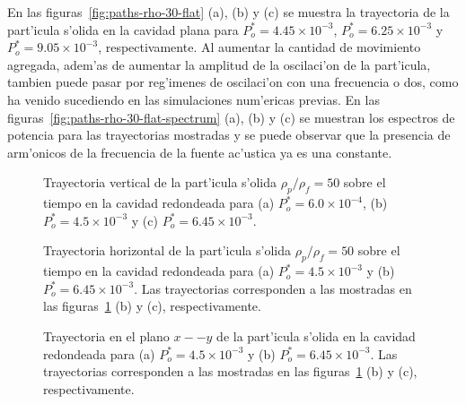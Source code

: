 En las figuras~\ref{fig:paths-rho-30-flat} (a), (b) y (c) se muestra la trayectoria de la part'icula
s'olida en la cavidad plana para $P_o^\ast = 4.45\times 10^{-3} $, $P_o^\ast = 6.25\times 10^{-3}$ y $P_o^\ast = 9.05\times 10^{-3}$,
respectivamente. Al aumentar la cantidad de movimiento agregada, adem'as de aumentar la amplitud de la oscilaci'on
de la part'icula, tambien puede pasar por reg'imenes de oscilaci'on con una frecuencia o dos, como ha venido sucediendo
en las simulaciones num'ericas previas. 
En las figuras~\ref{fig:paths-rho-30-flat-spectrum} (a), (b) y (c) se muestran los espectros
de potencia para las trayectorias mostradas y se puede observar que  la presencia de arm'onicos de la frecuencia
de la fuente ac'ustica  ya es una constante.



\begin{figure}

%


\caption{\label{fig:paths-rho-30-rounded}
Trayectoria vertical de la part'icula s'olida $\rho_p/\rho_f=50$ sobre el tiempo en la cavidad redondeada para
(a) $P_o^\ast = 6.0\times 10^{-4} $,
(b) $P_o^\ast = 4.5\times 10^{-3}$
y
(c) $P_o^\ast = 6.45\times 10^{-3}$.
}
\end{figure}
%
\begin{figure}


\caption{\label{fig:paths-rho-30-rounded-x}
Trayectoria horizontal de la part'icula s'olida $\rho_p/\rho_f=50$ sobre el tiempo en la cavidad redondeada para
(a) $P_o^\ast = 4.5\times 10^{-3}$
y
(b) $P_o^\ast = 6.45\times 10^{-3}$. Las trayectorias corresponden a las mostradas en las 
figuras~\ref{fig:paths-rho-30-rounded} (b) y (c), respectivamente.
}
\end{figure}
\begin{figure}


\caption{\label{fig:paths-rho-30-rounded-x-y} 
Trayectoria en el plano $x--y$ de la part'icula s'olida en la cavidad redondeada  para
(a) $P_o^\ast = 4.5\times 10^{-3}$
y
(b) $P_o^\ast = 6.45\times 10^{-3}$. Las trayectorias corresponden a las mostradas en las 
figuras~\ref{fig:paths-rho-30-rounded} (b) y (c), respectivamente.
}
\end{figure}
